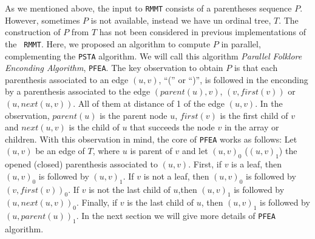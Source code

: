 As we mentioned above, the input to {\tt RMMT} consists of a
parentheses sequence $P$. However, sometimes $P$ is not available,
instead we have un ordinal tree, $T$. The construction of $P$ from $T$
has not been considered in previous implementations of the {\tt
  RMMT}. Here, we proposed an algorithm to compute $P$ in parallel,
complementing the {\tt PSTA} algorithm. We will call this algorithm
\emph{Parallel Folklore Enconding Algorithm}, {\tt PFEA}. The key
observation to obtain $P$ is that each parenthesis associated to an
edge $(u,v)$, ``('' or ``)'', is followed in the enconding by a
parenthesis associated to the edge $(parent(u), v)$, $(v, first(v))$
or $(u, next(u,v))$. All of them at distance of 1 of the edge
$(u,v)$. In the observation, $parent(u)$ is the parent node $u$,
$first(v)$ is the first child of $v$ and $next(u,v)$ is the child of
$u$ that succeeds the node $v$ in the array or children. With this
observation in mind, the core of {\tt PFEA} works as follows: Let
$(u,v)$ be an edge of $T$, where $u$ is parent of $v$ and let
$(u,v)_{0}$ ($(u,v)_{1}$) the opened (closed) parenthesis associated
to $(u,v)$. First, if $v$ is a leaf, then $(u,v)_{0}$ is followed by
$(u,v)_{1}$. If $v$ is not a leaf, then $(u,v)_{0}$ is followed by
$(v,first(v))_{0}$. If $v$ is not the last child of $u$,then
$(u,v)_{1}$ is followed by $(u,next(u,v))_{0}$. Finally, if $v$ is the
last child of $u$, then $(u,v)_{1}$ is followed by
$(u,parent(u))_{1}$. In the next section we will give more details of
{\tt PFEA} algorithm.
